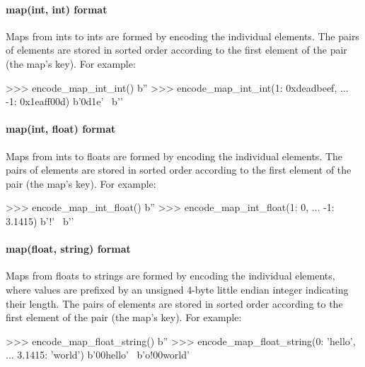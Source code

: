 \paragraph{map(int, int) format}

Maps from ints to ints are formed by encoding the individual elements.  The
pairs of elements are stored in sorted order according to the first element of
the pair (the map's key).  For example:

\begin{pythoncode}
>>> encode_map_int_int({})
b''
>>> encode_map_int_int({1: 0xdeadbeef,
...                     -1: 0x1eaff00d})
b'\xff\xff\xff\xff\xff\xff\xff\xff\x0d\xaf\x1e' \
b'\xef\xbe\xad\xde{}'
\end{pythoncode}

\paragraph{map(int, float) format}

Maps from ints to floats are formed by encoding the individual elements.  The
pairs of elements are stored in sorted order according to the first element of
the pair (the map's key).  For example:

\begin{pythoncode}
>>> encode_map_int_float({})
b''
>>> encode_map_int_float({1: 0,
...                       -1: 3.1415})
b'\xff\xff\xff\xff\xff\xff\xff\xffo{}\xca!\t@' \
b''
\end{pythoncode}

\paragraph{map(float, string) format}

Maps from floats to strings are formed by encoding the individual elements,
where values are prefixed by an unsigned 4-byte little endian integer indicating
their length.  The pairs of elements are stored in sorted order according to the
first element of the pair (the map's key).  For example:

\begin{pythoncode}
>>> encode_map_float_string({})
b''
>>> encode_map_float_string({0: 'hello',
...                          3.1415: 'world'})
b'\x00\x00\x00\x00\x00\x05\x00\x00\x00hello' \
b'o\xca!\t@{}\x00world'
\end{pythoncode}

